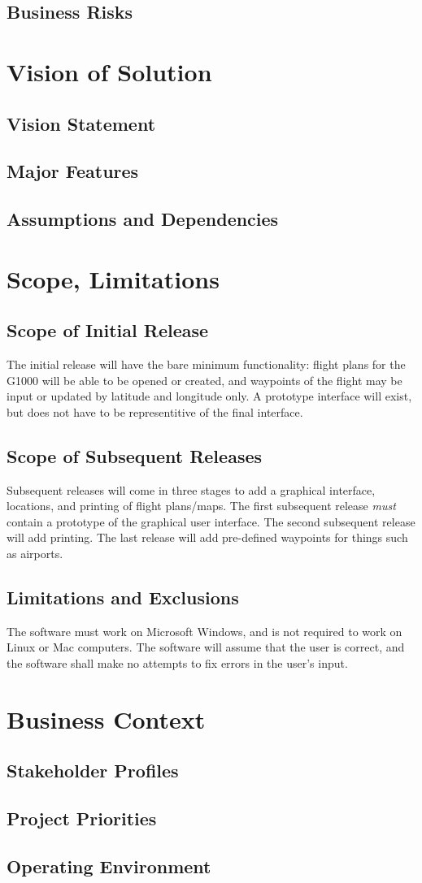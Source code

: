 \documentclass[12pt, letterpaper]{article}
\begin{document}
\subsection{Business Risks}

\section{Vision of Solution}
\subsection{Vision Statement}
\subsection{Major Features}
\subsection{Assumptions and Dependencies}

\section{Scope, Limitations}
\subsection{Scope of Initial Release}
The initial release will have the bare minimum functionality:
    flight plans for the G1000 will be able to be opened or created,
    and waypoints of the flight may be input or updated by latitude and longitude only.
A prototype interface will exist, but does not have to be representitive of the final interface.

\subsection{Scope of Subsequent Releases}
Subsequent releases will come in three stages to add a graphical interface, locations, and printing of flight plans/maps.
The first subsequent release \emph{must} contain a prototype of the graphical user interface.
The second subsequent release will add printing.
The last release will add pre-defined waypoints for things such as airports.

\subsection{Limitations and Exclusions}
The software must work on Microsoft Windows, and is not required to work on Linux or Mac computers.
The software will assume that the user is correct,
    and the software shall make no attempts to fix errors in the user's input.

\section{Business Context}
\subsection{Stakeholder Profiles}
\subsection{Project Priorities}
\subsection{Operating Environment}

{}

\end{document}
